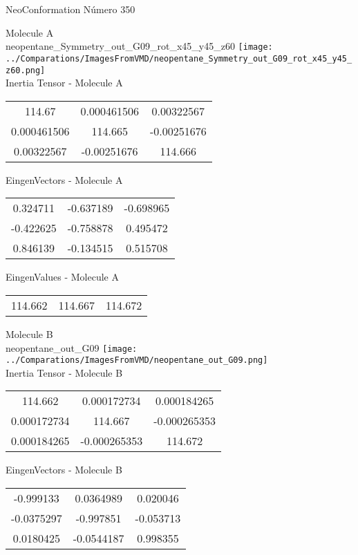 \vtab[-2cm]
\begin{center}
{\large NeoConformation \tab Número 350}
\end{center}
\begin{multicols}{2}
\begin{center}

Molecule A \\ 
neopentane\_Symmetry\_out\_G09\_rot\_x45\_y45\_z60
\texttt{[image: ../Comparations/ImagesFromVMD/neopentane\_Symmetry\_out\_G09\_rot\_x45\_y45\_z60.png]}
\\
Inertia Tensor - Molecule A \\
\vtab

\begin{tabular}{|c c c|}
114.67	 & 	0.000461506	 & 	0.00322567	 \\
0.000461506	 & 	114.665	 & 	-0.00251676	 \\
0.00322567	 & 	-0.00251676	 & 	114.666
\end{tabular}

\vtab
 EingenVectors - Molecule A     \\
\vtab
\begin{tabular}{|c c c|}
0.324711	 & 	-0.637189	 & 	-0.698965	 \\
-0.422625	 & 	-0.758878	 & 	0.495472	 \\
0.846139	 & 	-0.134515	 & 	0.515708
\end{tabular}

\vtab
 EingenValues - Molecule A     \\
\vtab
\begin{tabular}{|c c c|}
114.662	 & 	114.667	 & 	114.672	 \\
\end{tabular}
\columnbreak

Molecule B \\ 
neopentane\_out\_G09
\texttt{[image: ../Comparations/ImagesFromVMD/neopentane\_out\_G09.png]}
\\
Inertia Tensor - Molecule B \\
\vtab

\begin{tabular}{|c c c|}
114.662	 & 	0.000172734	 & 	0.000184265	 \\
0.000172734	 & 	114.667	 & 	-0.000265353	 \\
0.000184265	 & 	-0.000265353	 & 	114.672
\end{tabular}

\vtab
 EingenVectors - Molecule B     \\
\vtab
\begin{tabular}{|c c c|}
-0.999133	 & 	0.0364989	 & 	0.020046	 \\
-0.0375297	 & 	-0.997851	 & 	-0.053713	 \\
0.0180425	 & 	-0.0544187	 & 	0.998355
\end{tabular}


\end{center}
\end{multicols}

